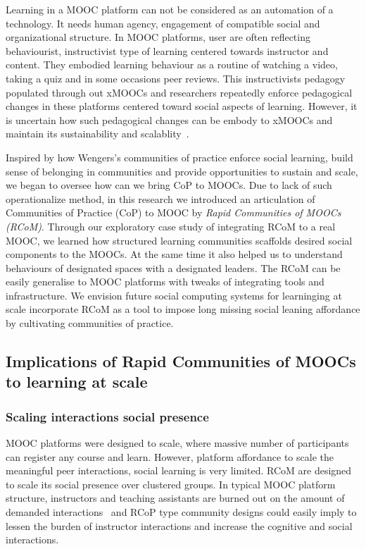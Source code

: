 \documentclass[manuscript,screen,review]{acmart}
\begin{document}
Learning in a MOOC platform can not be considered as an automation of a technology. It needs human agency, engagement of compatible social and organizational structure. In MOOC platforms, user are often reflecting behaviourist, instructivist type of learning centered towards instructor and content. They embodied learning behaviour as a routine of watching a video, taking a quiz and in some occasions peer reviews. This instructivists pedagogy populated through out xMOOCs and researchers repeatedly enforce pedagogical changes in these platforms centered toward social aspects of learning. However, it is uncertain how such pedagogical changes can be embody to xMOOCs and maintain its sustainability and scalablity~\cite{law2019sociotechnical,looi2015scaling}. 

Inspired by how Wengers's communities of practice enforce social learning, build sense of belonging in communities and provide opportunities to sustain and scale, we began to oversee how can we bring CoP to MOOCs. Due to lack of such operationalize method, in this research we introduced an articulation of Communities of Practice (CoP) to MOOC by \textit{Rapid Communities of MOOCs (RCoM)}. Through our exploratory case study of integrating RCoM to a real MOOC, we learned how structured learning communities scaffolds desired social components to the MOOCs. At the same time it also helped us to understand behaviours of designated spaces with a designated leaders. The RCoM can be easily generalise to MOOC platforms with tweaks of integrating tools and infrastructure. We envision future social computing systems for learninging at scale incorporate RCoM as a tool to impose long missing social leaning affordance by cultivating communities of practice. 

\subsection{Implications of Rapid Communities of MOOCs to learning at scale}

\subsubsection{Scaling interactions social presence} 
MOOC platforms were designed to scale, where massive number of participants can register any course and learn. However, platform affordance to scale the meaningful peer interactions, social learning is very limited. RCoM are designed to scale its social presence over clustered groups. In typical MOOC platform structure, instructors and  teaching assistants are burned out on the amount of demanded interactions~\cite{zheng2016ask} and RCoP type community designs could easily imply to lessen the burden of instructor interactions and increase the cognitive and social interactions. 
\end{document}
